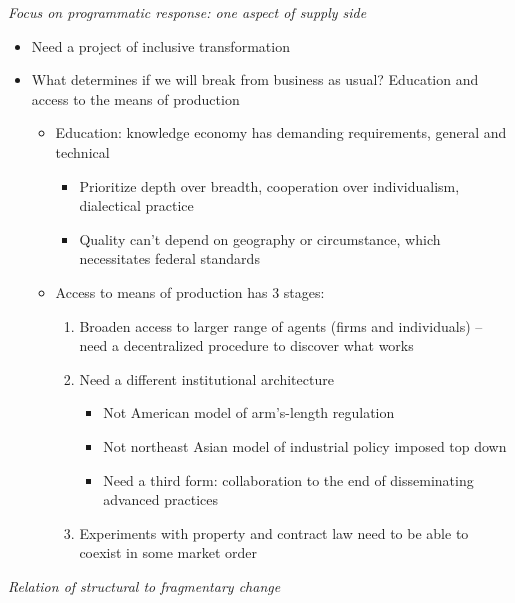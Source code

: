 \emph{Focus on programmatic response: one aspect of supply side}

\begin{itemize}
\tightlist
\item
  Need a project of inclusive transformation
\item
  What determines if we will break from business as usual? Education and
  access to the means of production

  \begin{itemize}
  \tightlist
  \item
    Education: knowledge economy has demanding requirements, general and
    technical

    \begin{itemize}
    \tightlist
    \item
      Prioritize depth over breadth, cooperation over individualism,
      dialectical practice
    \item
      Quality can't depend on geography or circumstance, which
      necessitates federal standards
    \end{itemize}
  \item
    Access to means of production has 3 stages:

    \begin{enumerate}
    \def\labelenumi{\arabic{enumi}.}
    \tightlist
    \item
      Broaden access to larger range of agents (firms and individuals)
      -- need a decentralized procedure to discover what works
    \item
      Need a different institutional architecture

      \begin{itemize}
      \tightlist
      \item
        Not American model of arm's-length regulation
      \item
        Not northeast Asian model of industrial policy imposed top down
      \item
        Need a third form: collaboration to the end of disseminating
        advanced practices
      \end{itemize}
    \item
      Experiments with property and contract law need to be able to
      coexist in some market order
    \end{enumerate}
  \end{itemize}
\end{itemize}

\emph{Relation of structural to fragmentary change}

